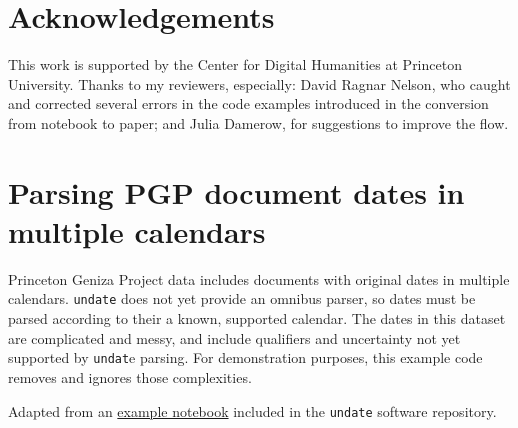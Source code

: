 \documentclass[final]{anthology-ch} %
\begin{document}
\section*{Acknowledgements}
This work is supported by the Center for Digital Humanities at Princeton University.  Thanks to my reviewers, especially: David Ragnar Nelson, who caught and corrected several errors in the code examples introduced in the conversion from notebook to paper; and Julia Damerow, for suggestions to improve the flow.

\printbibliography

\appendix

\section{Parsing PGP document dates in multiple calendars} \label{appdx:parse-pgp-dates}

Princeton Geniza Project data includes documents with original dates in multiple calendars.  \texttt{undate} does not yet provide an omnibus parser, so dates must be parsed according to their a known, supported calendar.  The dates in this dataset are complicated and messy, and include qualifiers and uncertainty not yet supported by \texttt{undat}e parsing. For demonstration purposes, this example code removes and ignores those complexities.

Adapted from an \href{https://github.com/dh-tech/undate-python/blob/main/examples/pgp_dates.ipynb}{example notebook} included in the \texttt{undate} software repository.
\end{document}
